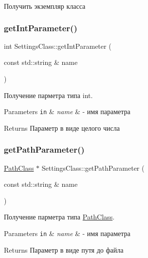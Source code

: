 Получить экземпляр класса 

\mbox{\label{class_settings_class_ad730e5806c7f08684108e12236ca87c0}} 
\subsubsection{\texorpdfstring{get\+Int\+Parameter()}{getIntParameter()}}
{\footnotesize\ttfamily int Settings\+Class\+::get\+Int\+Parameter (\begin{DoxyParamCaption}\item[{const std\+::string \&}]{name }\end{DoxyParamCaption})}



Получение парметра типа int. 


\begin{DoxyParams}[1]{Parameters}
\mbox{\tt in}  & {\em name} & -\/ имя параметра \\
\hline
\end{DoxyParams}
\begin{DoxyReturn}{Returns}
Параметр в виде целого числа 
\end{DoxyReturn}
\mbox{\label{class_settings_class_acb9a95b43f31fd24fa91e1bec7590c78}} 
\subsubsection{\texorpdfstring{get\+Path\+Parameter()}{getPathParameter()}}
{\footnotesize\ttfamily \hyperlink{class_path_class}{Path\+Class} $\ast$ Settings\+Class\+::get\+Path\+Parameter (\begin{DoxyParamCaption}\item[{const std\+::string \&}]{name }\end{DoxyParamCaption})}



Получение парметра типа \hyperlink{class_path_class}{Path\+Class}. 


\begin{DoxyParams}[1]{Parameters}
\mbox{\tt in}  & {\em name} & -\/ имя параметра \\
\hline
\end{DoxyParams}
\begin{DoxyReturn}{Returns}
Параметр в виде путя до файла 
\end{DoxyReturn}
\mbox{\label{class_settings_class_a87c73c3b4a33b8b5937bd5c64afb348d}} 
